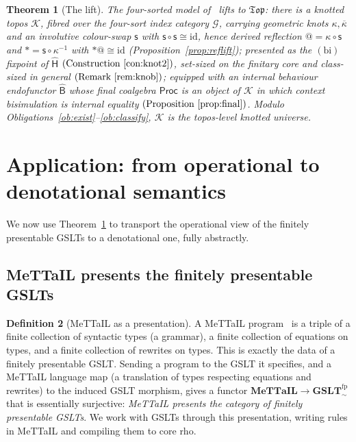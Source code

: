 \documentclass[11pt]{article}
\makeatletter
\newcommand{\Proc}{\mathsf{Proc}}
\newcommand{\Top}{\mathfrak{Top}}
\newcommand{\GSLTfp}{\mathbf{GSLT}^{\mathrm{fp}}_{\!\sim}}
\newcommand{\MeTTaIL}{\mathbf{MeTTaIL}}
\newcommand{\sH}{\widehat{\mathsf{H}}}
\newcommand{\sB}{\widehat{\mathsf{B}}}
\newcommand{\swap}{\mathsf{s}}
\newcommand{\id}{\mathrm{id}}
\newcommand{\sorts}{\mathcal{G}}
\newcommand{\Ks}{\mathcal{K}}
\newcommand{\quo}[1]{@#1}
\newcommand{\drf}[1]{{*}#1}
\theoremstyle{plain}
\newtheorem{theorem}{Theorem}
\theoremstyle{definition}
\newtheorem{definition}[theorem]{Definition}
\theoremstyle{remark}
\makeatother
\begin{document}
\begin{theorem}[The lift]\label{thm:lift}
The four-sorted model of~\cite{knotrho} lifts to $\Top$: there is a knotted topos $\Ks$, fibred over
the four-sort index category $\sorts$, carrying geometric knots $\kappa,\overline\kappa$ and an
involutive colour-swap $\swap$ with $\swap\circ\swap\cong\id$, hence derived reflection
$\quo{}=\kappa\circ\swap$ and $\drf{}=\swap\circ\kappa^{-1}$ with $\drf{}\quo{}\cong\id$
(Proposition~\ref{prop:reflift}); presented as the $(\text{bi})$fixpoint of $\sH$
$(\text{Construction~\ref{con:knot2}})$, set-sized on the finitary core and class-sized in general
$(\text{Remark~\ref{rem:knob}})$; equipped with an internal behaviour endofunctor $\sB$ whose final
coalgebra $\Proc$ is an object of $\Ks$ in which context bisimulation is internal equality
$(\text{Proposition~\ref{prop:final}})$. Modulo Obligations~\ref{ob:exist}--\ref{ob:classify}, $\Ks$
is the topos-level knotted universe.
\end{theorem}

\section{Application: from operational to denotational semantics}\label{sec:app}

We now use Theorem~\ref{thm:lift} to transport the operational view of the finitely presentable GSLTs
to a denotational one, fully abstractly.

\subsection{MeTTaIL presents the finitely presentable GSLTs}

\begin{definition}[MeTTaIL as a presentation]\label{def:mettail}
A MeTTaIL program~\cite{mettail} is a triple of a finite collection of syntactic types (a grammar), a
finite collection of equations on types, and a finite collection of rewrites on types. This is exactly
the data of a finitely presentable GSLT. Sending a program to the GSLT it specifies, and a MeTTaIL
language map (a translation of types respecting equations and rewrites) to the induced GSLT morphism,
gives a functor $\MeTTaIL\to\GSLTfp$ that is essentially surjective: \emph{MeTTaIL presents the
category of finitely presentable GSLTs}. We work with GSLTs through this presentation, writing rules
in MeTTaIL and compiling them to core rho.
\end{definition}
\end{document}
